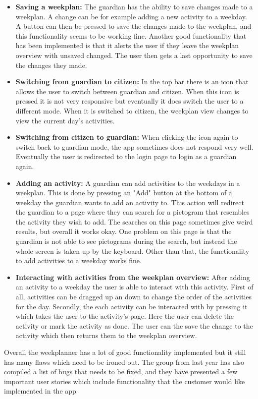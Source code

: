 \begin{itemize}
    \\
    \item \textbf{Saving a weekplan:} The guardian has the ability to save changes made to a weekplan. A change can be for example adding a new activity to a weekday.
    A button can then be pressed to save the changes made to the weekplan, and this functionality seems to be working fine.
    Another good functionality that has been implemented is that it alerts the user if they leave the weekplan overview with unsaved changed. The user then gets a last opportunity to save the changes they made.
    \\
    \item \textbf{Switching from guardian to citizen:} In the top bar there is an icon that allows the user to switch between guardian and citizen. 
    When this icon is pressed it is not very responsive but eventually it does switch the user to a different mode. 
    When it is switched to citizen, the weekplan view changes to view the current day's activities.
    \\
    \item \textbf{Switching from citizen to guardian:} When clicking the icon again to switch back to guardian mode, the app sometimes does not respond very well. 
    Eventually the user is redirected to the login page to login as a guardian again.
    \\
    \item \textbf{Adding an activity:} A guardian can add activities to the weekdays in a weekplan. This is done by pressing an "Add" button at the bottom of a weekday the guardian wants to add an activity to.
    This action will redirect the guardian to a page where they can search for a pictogram that resembles the activity they wish to add. The searches on this page sometimes give weird results, but overall it works okay.
    One problem on this page is that the guardian is not able to see pictograms during the search, but instead the whole screen is taken up by the keyboard. 
    Other than that, the functionality to add activities to a weekday works fine.
    \\
    \item \textbf{Interacting with activities from the weekplan overview:} After adding an activity to a weekday the user is able to interact with this activity. 
    First of all, activities can be dragged up an down to change the order of the activities for the day. 
    Secondly, the each activity can be interacted with by pressing it which takes the user to the activity's page. 
    Here the user can delete the activity or mark the activity as done. The user can the save the change to the activity which then returns them to the weekplan overview.
    \\
\end{itemize}
Overall the weekplanner has a lot of good functionality implemented but it still has many flaws which need to be ironed out. 
The group from last year has also compiled a list of bugs that needs to be fixed, and they have presented a few important user stories which include functionality that the customer would like implemented in the app
